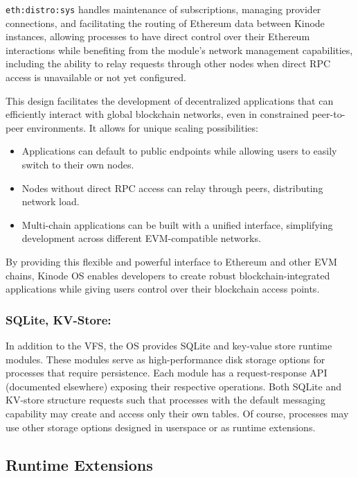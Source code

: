 \documentclass[runningheads]{llncs}
\begin{document}
\verb|eth:distro:sys| handles maintenance of subscriptions, managing provider connections, and facilitating the routing of Ethereum data between Kinode instances, allowing processes to have direct control over their Ethereum interactions while benefiting from the module's network management capabilities, including the ability to relay requests through other nodes when direct RPC access is unavailable or not yet configured.

This design facilitates the development of decentralized applications that can efficiently interact with global blockchain networks, even in constrained peer-to-peer environments. It allows for unique scaling possibilities:

\begin{itemize}
	\item Applications can default to public endpoints while allowing users to easily switch to their own nodes.
	\item Nodes without direct RPC access can relay through peers, distributing network load.
	\item Multi-chain applications can be built with a unified interface, simplifying development across different EVM-compatible networks.
\end{itemize}

By providing this flexible and powerful interface to Ethereum and other EVM chains, Kinode OS enables developers to create robust blockchain-integrated applications while giving users control over their blockchain access points.

\subsubsection{SQLite, KV-Store:}
\label{sec:osdbs}

In addition to the VFS, the OS provides SQLite and key-value store runtime modules.
These modules serve as high-performance disk storage options for processes that require persistence.
Each module has a request-response API (documented elsewhere) exposing their respective operations.
Both SQLite and KV-store structure requests such that processes with the default messaging capability may create and access only their own tables.
Of course, processes may use other storage options designed in userspace or as runtime extensions.

\subsection{Runtime Extensions}
\label{sec:osextensions}
\end{document}
